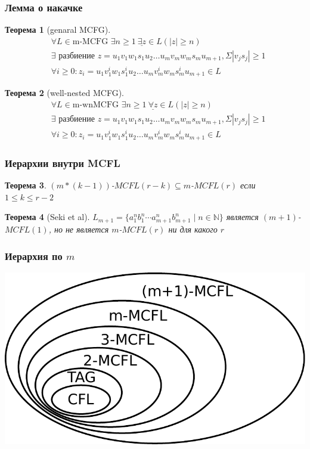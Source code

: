 \documentclass{beamer}
\newtheorem{rutheorem}{Теорема}
\begin{document}
\begin{frame}[fragile]
  
  \frametitle{Лемма о накачке}
  \begin{rutheorem}[genaral MCFG]
    \begin{align*}
    &\forall L \in \text{m-MCFG } \exists n \geq 1 \ \underline{\boldsymbol{\exists} z} \in L (|z| \geq n)  \\
    &\exists \text{ разбиение } z=u_1 v_1 w_1 s_1 u_2 \ldots u_m v_m w_m s_m u_{m+1}, \Sigma|v_js_j| \geq 1 \\
    &\forall i \geq 0: z_i = u_1 v_1^i w_1 s_1^i u_2 \ldots u_m v_m^i w_m s_m^i u_{m+1} \in L
    \end{align*}
  \end{rutheorem}
\pause
  \begin{rutheorem}[well-nested MCFG]
    \begin{align*}
    &\forall L \in \text{m-wnMCFG } \exists n \geq 1 \ \underline{\boldsymbol{\forall} z} \in L (|z| \geq n)  \\
    &\exists \text{ разбиение } z=u_1 v_1 w_1 s_1 u_2 \ldots u_m v_m w_m s_m u_{m+1}, \Sigma|v_js_j| \geq 1 \\
    &\forall i \geq 0: z_i = u_1 v_1^i w_1 s_1^i u_2 \ldots u_m v_m^i w_m s_m^i u_{m+1} \in L
    \end{align*}
  \end{rutheorem}
\end{frame}

\begin{frame}[fragile]
  
  \frametitle{Иерархии внутри MCFL}
  \begin{rutheorem}
  $(m*(k-1))$-$MCFL(r-k) \subseteq m$-$MCFL(r) $ если $1 \leq k \leq r - 2$ 
  \end{rutheorem}
  \pause
  \begin{rutheorem}[Seki et al]
  $L_{m+1} = \{a_1^nb_1^n\cdots a_{m+1}^n b_{m+1}^n \mid n\in \mathbb{N}\}$ является $(m+1)$-$MCFL(1)$, но не является $m$-$MCFL(r)$ ни для какого $r$ 
  \end{rutheorem}
  

\end{frame}


\begin{frame}[fragile]
  
  \frametitle{Иерархия по $m$}
  
\includegraphics[width=\textwidth]{pics/mcfg.pdf}
\end{frame}
\end{document}
